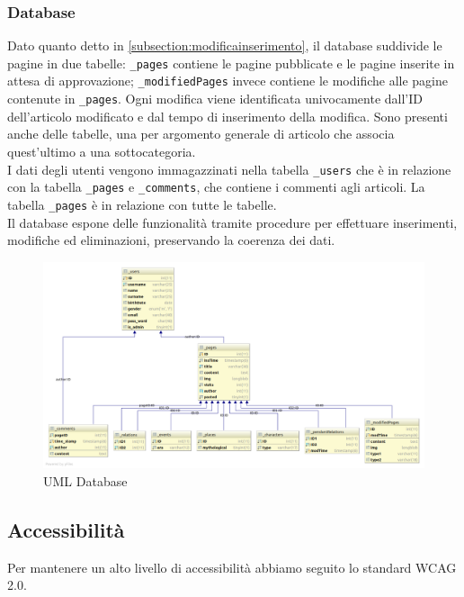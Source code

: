 \subsubsection{Database}
Dato quanto detto in \ref{subsection:modificainserimento}, il database suddivide le pagine in due tabelle: \texttt{\_pages} contiene le pagine pubblicate e le pagine inserite in attesa di approvazione; \texttt{\_modifiedPages} invece contiene le modifiche alle pagine contenute in \texttt{\_pages}. Ogni modifica viene identificata univocamente dall'ID dell'articolo modificato e dal tempo di inserimento della modifica. Sono presenti anche delle tabelle, una per argomento generale di articolo che associa quest'ultimo a una sottocategoria.\\
I dati degli utenti vengono immagazzinati nella tabella \texttt{\_users} che è in relazione con la tabella \texttt{\_pages} e \texttt{\_comments}, che contiene i commenti agli articoli. La tabella \texttt{\_pages} è in relazione con tutte le tabelle.\\
Il database espone delle funzionalità tramite procedure per effettuare inserimenti, modifiche ed eliminazioni, preservando la coerenza dei dati.
\begin{figure}[H]
	\begin{center}
		\includegraphics[width=14cm]{img/UML_database.png}
		\caption{UML Database}
	\end{center}
\end{figure}

\subsection{Accessibilità}
Per mantenere un alto livello di accessibilità abbiamo seguito lo standard WCAG 2.0.

